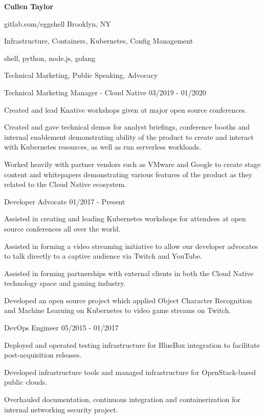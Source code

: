 \documentclass[12pt]{article} %
\begin{document}
\centerline{{\Huge \bf Cullen Taylor}}
\bigskip

        {gitlab.com/eggshell}
        {Brooklyn, NY}
        {}


      {Infrastructure, Containers, Kubernetes, Config Management}

      {shell, python, node.js, golang}

      {Technical Marketing, Public Speaking, Advocacy}


\begin{description}
{}
           {Technical Marketing Manager - Cloud Native}
           {03/2019 - 01/2020}

Created and lead Knative workshops given at major open source conferences.

Created and gave technical demos for analyst briefings, conference booths and
internal enablement demonstrating ability of the product to create and interact
with Kubernetes resources, as well as run serverless workloads.

Worked heavily with partner vendors such as VMware and Google to create stage
content and whitepapers demonstrating various features of the product as they
related to the Cloud Native ecosystem.

           {Developer Advocate}
           {01/2017 - Present}

Assisted in creating and leading Kubernetes workshops for attendees at open
source conferences all over the world.

Assisted in forming a video streaming initiative to allow our developer
advocates to talk directly to a captive audience via Twitch and YouTube.

Assisted in forming partnerships with external clients in both the Cloud Native
technology space and gaming industry.

Developed an open source project which applied Object Character Recognition
and Machine Learning on Kubernetes to video game streams on Twitch.

           {DevOps Engineer}
           {05/2015 - 01/2017}

Deployed and operated testing infrastructure for BlueBox integration to
facilitate post-acquisition releases.

Developed infrastructure tools and managed infrastructure for OpenStack-based
public clouds.

Overhauled documentation, continuous integration and containerization for
internal networking security project.
\end{description}
\end{document}
